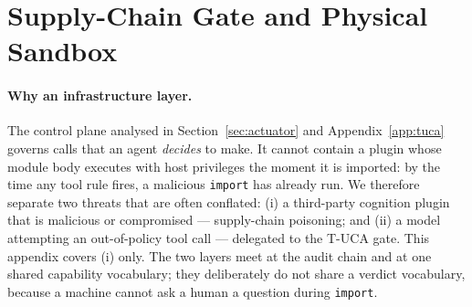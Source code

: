 
\section{Supply-Chain Gate and Physical Sandbox}
\label{sec:app:supplychain}

\paragraph{Why an infrastructure layer.}
The control plane analysed in Section~\ref{sec:actuator} and
Appendix~\ref{app:tuca} governs calls that an agent \emph{decides} to make. It
cannot contain a plugin whose module body executes with host privileges the
moment it is imported: by the time any tool rule fires, a malicious
\texttt{import} has already run. We therefore separate two threats that are
often conflated: (i) a third-party cognition plugin that is malicious or
compromised --- supply-chain poisoning; and (ii) a model attempting an
out-of-policy tool call --- delegated to the T-UCA gate. This appendix covers
(i) only. The two layers meet at the audit chain and at one shared capability
vocabulary; they deliberately do not share a verdict vocabulary, because a
machine cannot ask a human a question during \texttt{import}.

